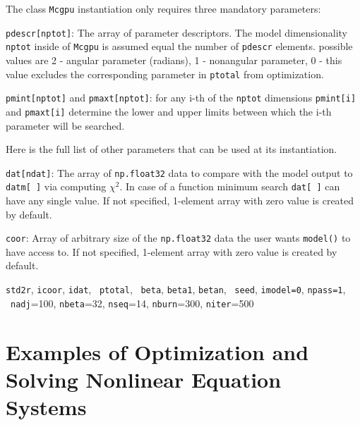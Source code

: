 \documentclass[preprint2]{aastex}
\begin{document}
The class \verb|Mcgpu| instantiation only requires three mandatory parameters:

\verb|pdescr[nptot]|: The array of parameter descriptors. The model dimensionality
\verb|nptot| inside of \verb|Mcgpu| is assumed equal the number of \verb|pdescr|
elements. possible values are 2 - angular parameter (radians), 1 - nonangular parameter,
0 - this value excludes the corresponding parameter in \verb|ptotal| from optimization.

\verb|pmint[nptot]| and \verb|pmaxt[nptot]|: for any i-th of the \verb|nptot| dimensions
\verb|pmint[i]| and \verb|pmaxt[i]| determine the lower and upper limits between 
which the i-th parameter will be searched. 

Here is the full list of other parameters that can be used at its instantiation.

\verb|dat[ndat]|: The array of \verb|np.float32| data to compare with the model
output to \verb|datm[ ]| via computing $\chi^2$. In case of a 
function minimum search \verb|dat[ ]| can have any single value. If not specified,
1-element array with zero value is created by default.

\verb|coor|: Array of arbitrary size of the \verb|np.float32| data the user 
wants \verb|model()| to have access to. If not specified, 1-element array with 
zero value is created by default.   

\verb|std2r|, \verb|icoor|, \verb|idat|, \
				 \verb|ptotal|,  \
				 \verb|beta|, \verb|beta1|, \verb|betan|,	\
				 \verb|seed|, \verb|imodel=0|, \verb|npass=1|, \
				 \verb|nadj|=100, \verb|nbeta|=32, \verb|nseq|=14,  \verb|nburn|=300, \verb|niter|=500 


\section{Examples of Optimization and Solving Nonlinear Equation Systems}


\clearpage



\end{document}
